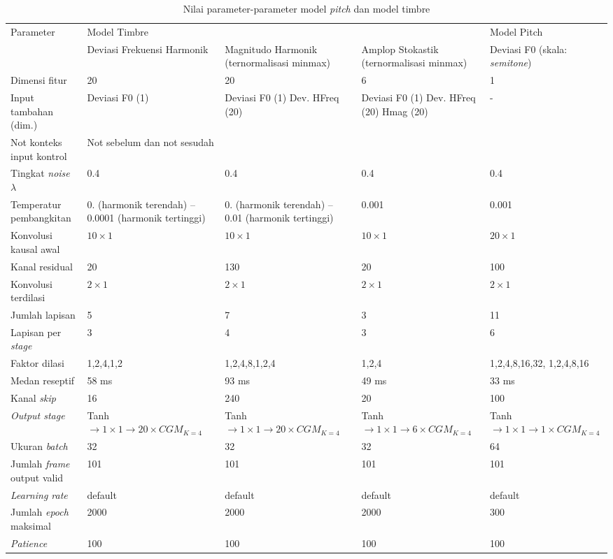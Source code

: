 \begin{table}[htbp]
	\newlength\colwidth
	\setlength{}
	\centering
	\caption{Nilai parameter-parameter model \textit{pitch} dan model timbre}\label{tab-timbre-pitch-model-parameters}
	\begin{tabular}{|p{\colwidth}|p{\colwidth}|p{\colwidth}|p{\colwidth}|p{\colwidth}|}
	\hline
	\multirow{2}{*}{Parameter}&\multicolumn{3}{|p{\dimexpr 3\colwidth}|}{Model Timbre}&{Model Pitch}\\\cline{2-5}
	&Deviasi Frekuensi Harmonik&Magnitudo Harmonik (ternormalisasi minmax)&Amplop Stokastik (ternormalisasi minmax)&Deviasi F0 (skala: \textit{semitone})\\\hline
	Dimensi fitur&20&20&6&1\\\hline
	Input tambahan (dim.)& Deviasi F0 (1) & Deviasi F0 (1) \newline Dev. HFreq (20) & Deviasi F0 (1) \newline Dev. HFreq (20) \newline Hmag (20) & - \\
	\hline
	Not konteks input kontrol & \multicolumn{4}{|p{\dimexpr 4\colwidth}|}{
	Not sebelum dan not sesudah
	}\\\hline
	Tingkat \textit{noise} $\lambda$ & 0.4&0.4&0.4&0.4\\\hline
	Temperatur pembangkitan & 0. (harmonik terendah) – 0.0001 (harmonik tertinggi) & 0. (harmonik terendah) – 0.01 (harmonik tertinggi) & 0.001 & 0.001 \\\hline
	Konvolusi kausal awal & $10 \times 1$ & $10 \times 1$ & $10 \times 1 $ & $20 \times 1 $\\\hline
	Kanal residual & 20 & 130 & 20 & 100 \\\hline
	Konvolusi terdilasi & $2\times 1$ & $2\times 1$ & $2\times 1$ & $2\times 1$ \\\hline
	Jumlah lapisan & 5 & 7 & 3 & 11\\\hline
	Lapisan per \textit{stage} & 3 & 4 & 3 & 6\\\hline
	Faktor dilasi & 1,2,4,1,2 & 1,2,4,8,1,2,4 & 1,2,4 & 1,2,4,8,16,32, 1,2,4,8,16\\\hline
	Medan reseptif&58 ms & 93 ms & 49 ms & 33 ms\\\hline
	Kanal \textit{skip}&16&240&20&100\\\hline
	\textit{Output stage}&Tanh$\rightarrow 1\times 1 \rightarrow 20\times CGM_{K=4}$&Tanh$\rightarrow 1\times 1 \rightarrow 20\times CGM_{K=4}$&Tanh$\rightarrow 1\times 1 \rightarrow 6\times CGM_{K=4}$&Tanh$\rightarrow 1\times 1 \rightarrow 1\times CGM_{K=4}$\\\hline
	Ukuran \textit{batch} &32&32&32& 64\\\hline
	Jumlah \textit{frame} output valid & 101 & 101 & 101 & 101 \\\hline
	\textit{Learning rate} & default & default & default & default\\\hline
	Jumlah \textit{epoch} maksimal & 2000 & 2000 & 2000 & 300 \\\hline
	\textit{Patience} & 100 & 100 & 100 & 100 \\\hline
	\end{tabular}
\end{table}
